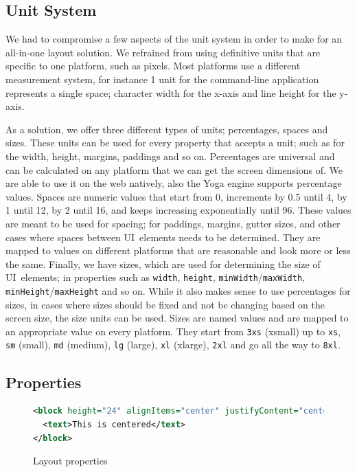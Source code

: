 \subsection{Unit System}

We had to compromise a few aspects of the unit system in order to make for an all-in-one layout solution. We refrained from using definitive units that are specific to one platform, such as pixels. Most platforms use a different measurement system, for instance 1 unit for the command-line application represents a single space; character width for the x-axis and line height for the y-axis.

As a solution, we offer three different types of units; percentages, spaces and sizes. These units can be used for every property that accepts a unit; such as for the width, height, margins, paddings and so on. Percentages are universal and can be calculated on any platform that we can get the screen dimensions of. We are able to use it on the web natively, also the Yoga engine supports percentage values. Spaces are numeric values that start from 0, increments by 0.5 until 4, by 1 until 12, by 2 until 16, and keeps increasing exponentially until 96. These values are meant to be used for spacing; for paddings, margins, gutter sizes, and other cases where spaces between UI~elements needs to be determined. They are mapped to values on different platforms that are reasonable and look more or less the same. Finally, we have sizes, which are used for determining the size of UI~elements; in properties such as \texttt{width}, \texttt{height}, \texttt{minWidth}/\texttt{maxWidth}, \texttt{minHeight}/\texttt{maxHeight} and so on. While it also makes sense to use percentages for sizes, in cases where sizes should be fixed and not be changing based on the screen size, the size units can be used. Sizes are named values and are mapped to an appropriate value on every platform. They start from \texttt{3xs} (xsmall) up to \texttt{xs}, \texttt{sm} (small), \texttt{md} (medium), \texttt{lg} (large), \texttt{xl} (xlarge), \texttt{2xl} and go all the way to \texttt{8xl}.

\subsection{Properties}

\begin{figure}[htb]
\begin{minipage}{\linewidth}
\begin{lstlisting}[language=xml]
<block height="24" alignItems="center" justifyContent="center">
  <text>This is centered</text>
</block>
\end{lstlisting}
\end{minipage}
\caption{Layout properties}%
\label{fig:layout_props_example}%
\end{figure}

